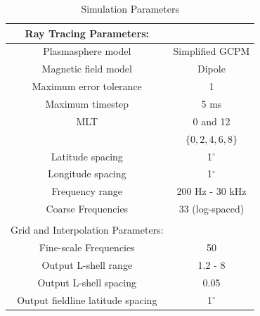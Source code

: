 \begin{table}[h!]
\caption{Simulation Parameters}
\begin{center}

\begin{tabular}{c|c}
Ray Tracing Parameters: & \\
\hline \hline
Plasmasphere model & Simplified GCPM \\
Magnetic field model & Dipole \\
Maximum error tolerance & 1\E{-3} \\
Maximum timestep & 5 ms \\
MLT & 0 and 12 \\
\kp{} & $\{0, 2, 4, 6, 8\}$ \\
Latitude spacing & 1$^\circ$ \\
Longitude spacing & 1$^\circ$ \\
Frequency range & 200 Hz - 30 kHz \\
Coarse Frequencies & 33 (log-spaced) \\
& \\
Grid and Interpolation Parameters: \\
\hline \hline
Fine-scale Frequencies & 50 \\
Output L-shell range & 1.2 - 8 \\
Output L-shell spacing & 0.05 \\
Output fieldline latitude spacing & 1$^\circ$ \\
\end{tabular}
%
\end{center}
\label{tab:simulation_params}
\end{table}%

